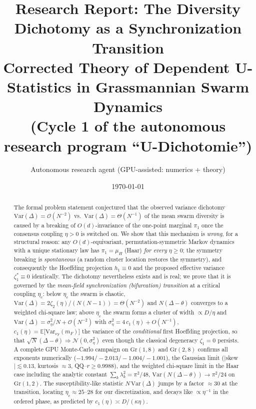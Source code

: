 \documentclass[11pt]{article}
\title{\textbf{Research Report: The Diversity Dichotomy as a Synchronization Transition}\\
\large Corrected Theory of Dependent U-Statistics in Grassmannian Swarm Dynamics\\
\small (Cycle 1 of the autonomous research program ``U-Dichotomie'')}
\author{Autonomous research agent (GPU-assisted: numerics + theory)}
\date{\today}
\theoremstyle{definition}
\newcommand{\Gr}{\mathrm{Gr}}
\newcommand{\E}{\mathbb{E}}
\newcommand{\Var}{\mathrm{Var}}
\begin{document}
\maketitle

\begin{abstract}
The formal problem statement conjectured that the observed variance dichotomy
$\Var(\Delta)=\mathcal O(N^{-2})$ vs.\ $\Var(\Delta)=\Theta(N^{-1})$ of the mean swarm
diversity is caused by a breaking of $O(d)$-invariance of the one-point marginal
$\pi_1$ once the consensus coupling $\eta>0$ is switched on. We show that this
mechanism is \emph{wrong}, for a structural reason: any $O(d)$-equivariant,
permutation-symmetric Markov dynamics with a unique stationary law has
$\pi_1=\mu_H$ (Haar) \emph{for every} $\eta\ge 0$; the symmetry breaking is
\emph{spontaneous} (a random cluster location restores the symmetry), and consequently
the Hoeffding projection $h_1\equiv0$ and the proposed effective variance
$\zeta_1^*\equiv 0$ identically. The dichotomy nevertheless exists and is real;
we prove that it is governed by the \emph{mean-field synchronization (bifurcation)
transition} at a critical coupling $\eta_c$: below $\eta_c$ the swarm is chaotic,
$\Var(\Delta)=2\zeta_2(\eta)/(N(N-1))=\Theta(N^{-2})$ and $N(\Delta-\theta)$ converges
to a weighted chi-square law; above $\eta_c$ the swarm forms a cluster of width
$\propto D/\eta$ and
$\Var(\Delta)=\sigma_\eta^2/N+\mathcal O(N^{-2})$ with
$\sigma_\eta^2=4\,c_1(\eta)+O(N^{-1})$, $c_1(\eta)=\E\bigl[\Var_{\nu_F}(m_F)\bigr]$
the variance of the \emph{conditional} first Hoeffding projection, so that
$\sqrt N(\Delta-\theta)\Rightarrow\mathcal N(0,\sigma_\eta^2)$ even though the classical
degeneracy $\zeta_1=0$ persists. A complete GPU Monte-Carlo campaign on
$\Gr(1,8)$ and $\Gr(2,8)$ confirms all exponents numerically
($-1.994/-2.013/-1.004/-1.001$), the Gaussian limit ($|$skew$|\lesssim0.13$,
kurtosis $\approx3$, QQ--$r\ge0.9988$), and the weighted chi-square limit in the Haar
case including the analytic constant $\sum_k\lambda_k^2=\pi^2/48$,
$\Var(N(\Delta-\theta))\to\pi^2/24$ on $\Gr(1,2)$. The susceptibility-like statistic
$N\,\Var(\Delta)$ jumps by a factor $\approx30$ at the transition, locating
$\eta_c\approx25$--$28$ for our discretization, and decays like $\propto\eta^{-1}$
in the ordered phase, as predicted by $c_1(\eta)\asymp D/(\kappa\eta)$.
\end{abstract}

\end{document}
